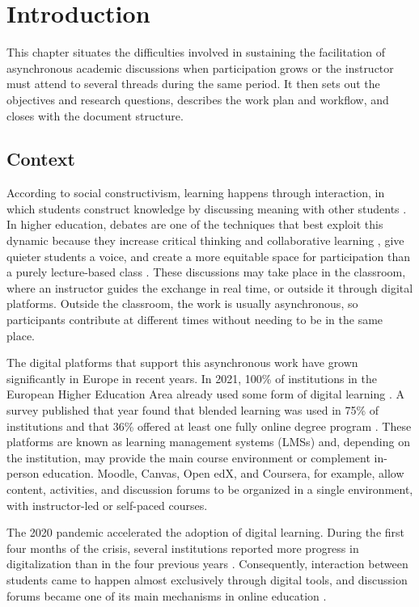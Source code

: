 \chapter{Introduction}
\label{chap:introduction-en}

This chapter situates the difficulties involved in sustaining the facilitation of asynchronous academic discussions when participation grows or the instructor must attend to several threads during the same period. It then sets out the objectives and research questions, describes the work plan and workflow, and closes with the document structure.

\section{Context}

According to social constructivism, learning happens through interaction, in which students construct knowledge by discussing meaning with other students \parencite{WooReeves2007}. In higher education, debates are one of the techniques that best exploit this dynamic because they increase critical thinking and collaborative learning \parencite{Brown2015}, give quieter students a voice, and create a more equitable space for participation than a purely lecture-based class \parencite{BineyEkeyi2018,WooReeves2007}. These discussions may take place in the classroom, where an instructor guides the exchange in real time, or outside it through digital platforms. Outside the classroom, the work is usually asynchronous, so participants contribute at different times without needing to be in the same place.

The digital platforms that support this asynchronous work have grown significantly in Europe in recent years. In 2021, 100\% of institutions in the European Higher Education Area already used some form of digital learning \parencite{GaebelEtAl2021}. A survey published that year found that blended learning was used in 75\% of institutions and that 36\% offered at least one fully online degree program \parencite{GaebelEtAl2021}. These platforms are known as learning management systems (LMSs) and, depending on the institution, may provide the main course environment or complement in-person education. Moodle, Canvas, Open edX, and Coursera, for example, allow content, activities, and discussion forums to be organized in a single environment, with instructor-led or self-paced courses.

The 2020 pandemic accelerated the adoption of digital learning. During the first four months of the crisis, several institutions reported more progress in digitalization than in the four previous years \parencite{GaebelEtAl2021}. Consequently, interaction between students came to happen almost exclusively through digital tools, and discussion forums became one of its main mechanisms in online education \parencite{Rovai2007,MasseyEtAl2019}.

